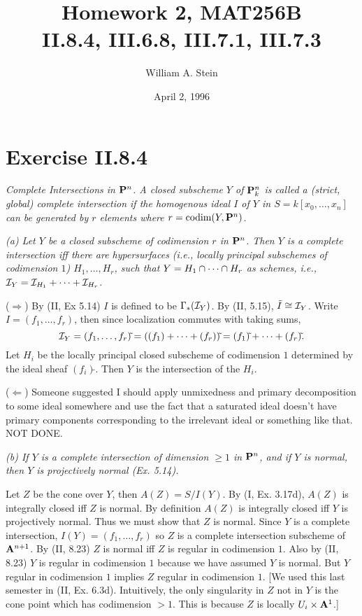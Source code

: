 \documentclass[12pt]{article}
\author{William A. Stein}
\title{Homework 2, MAT256B\\II.8.4, III.6.8, III.7.1, III.7.3}
\date{April 2, 1996}
\begin{document}
\maketitle

\section{Exercise II.8.4}
{\em Complete Intersections in $\P^n$. 
A closed subscheme $Y$ of $\P^n_k$ is called a {\em (strict, global)
complete intersection} if the homogenous ideal $I$ of $Y$ in
$S=k[x_0,\ldots,x_n]$ can be generated by $r$ elements where
$r=\codim(Y,\P^n)$.} 

{\em (a) Let $Y$ be a closed subscheme of codimension $r$ in $\P^n$. Then
$Y$ is a complete intersection iff there are hypersurfaces (i.e., locally
principal subschemes of codimension $1$) $H_1,\ldots,H_r$, such that
$Y=H_1\intersect\cdots\intersect H_r$ {\em as schemes}, i.e.,
$\sI_Y=\sI_{H_1}+\cdots+\sI_{H_r}$.}

($\Rightarrow$) By (II, Ex 5.14) $I$ is defined to be $\Gamma_{*}(\sI_Y)$.
By (II, 5.15), $\tilde{I}\isom\sI_Y$. Write $I=(f_1,\ldots,f_r)$, then
since localization commutes with taking sums,
$$\sI_Y=(f_1,\ldots,f_r)\tilde{ }=((f_1)+\cdots+(f_r))\tilde{ }=(f_1)\tilde{ }+\cdots+(f_r)\tilde{ }.$$
Let $H_i$ be the locally principal closed subscheme of codimension
$1$ determined by the ideal sheaf $(f_i)\tilde{ }$.  Then $Y$ is the
intersection of the $H_i$. 

($\Leftarrow$) Someone suggested I should apply unmixedness and 
primary decomposition to some ideal somewhere and use the fact 
that a saturated ideal doesn't have primary components corresponding 
to the irrelevant ideal or something like that. NOT DONE.  

{\em (b) If $Y$ is a complete intersection of dimension $\geq 1$ in
$\P^n$, and if $Y$ is normal, then $Y$ is projectively normal (Ex. 5.14).}

Let $Z$ be the cone over $Y$, then $A(Z)=S/I(Y)$. By
(I, Ex. 3.17d), $A(Z)$ is integrally closed iff $Z$ is
normal. By definition $A(Z)$ is integrally closed iff
$Y$ is projectively normal. Thus we must show that $Z$
is normal. Since $Y$ is a complete intersection, $I(Y)=(f_1,\ldots,f_r)$
so $Z$ is a complete intersection subscheme of $\bA^{n+1}$. By
(II, 8.23) $Z$ is normal iff $Z$ is regular in codimension $1$. 
Also by (II, 8.23) $Y$ is regular in codimension $1$ because we
have assumed $Y$ is normal. But $Y$ regular in codimension $1$ implies
$Z$ regular in codimension $1$. [We used this last semester in 
(II, Ex. 6.3d). Intuitively, the only singularity in $Z$ not in $Y$
is the cone point which has codimension $>1$. This is because $Z$
is locally $U_i\cross\bA^1$.] 
\end{document}
